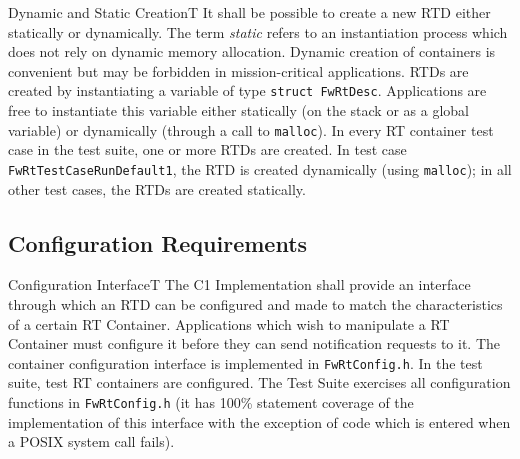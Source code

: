 \documentclass[a4paper,10pt]{article}
\newenvironment{fw_req}[6]
{\addtocounter{subsubsection}{1}
	\hspace{0.2cm}\textbf{FW-\arabic{section}.\arabic{subsection}.\arabic{subsubsection}/#2
	\hspace{0.8cm} #1}
	\vspace{-10pt}
\begin{longtable}{p{2.7cm}P{8.5cm}}
\hline
\textsc{Requirement} & #3 \\
\textsc{Justification} & #4 \\
\textsc{Implementation} & #5  \\ 
\textsc{Verification} & #6  \\
\hline
}
{\end{longtable}}
\newenvironment{fw_req_note}[7]
{\addtocounter{subsubsection}{1}
	\hspace{0.2cm}\textbf{FW-\arabic{section}.\arabic{subsection}.\arabic{subsubsection}/#2
	\hspace{0.8cm} #1}
	\vspace{-10pt}
\begin{longtable}{p{2.7cm}P{8.5cm}}
\hline
\textsc{Requirement} & #3 \\
\textsc{Note} & #4 \\
\textsc{Justification} & #5 \\
\textsc{Implementation} & #6  \\ 
\textsc{Verification} & #7  \\
\hline
}
{\end{longtable}}
\begin{document}
\begin{fw_req_note}{Dynamic and Static Creation}{T}
{ It shall be possible to create a new RTD either statically or dynamically.}
{The term \emph{static} refers to an instantiation process which does not rely on dynamic memory allocation.}
{Dynamic creation of containers is convenient but may be forbidden in mission-critical applications.}
{RTDs are created by instantiating a variable of type \texttt{struct FwRtDesc}. Applications are free to instantiate this variable either statically (on the stack or as a global variable) or dynamically (through a call to \texttt{malloc}). } 
{In every RT container test case in the test suite, one or more RTDs are created. In test case \texttt{FwRtTestCaseRunDefault1}, the RTD is created dynamically (using \texttt{malloc}); in all other test cases, the RTDs are created statically.}
\end{fw_req_note}


\subsection{Configuration Requirements}\label{req:configInterfaceRTD}

\begin{fw_req}{Configuration Interface}{T}
{The C1 Implementation shall provide an interface through which an RTD can be configured and made to match the characteristics of a certain RT Container.}
{Applications which wish to manipulate a RT Container must configure it before they can send notification requests to it.}
{The container configuration interface is implemented in \texttt{FwRtConfig.h}.} 
{In the test suite, test RT containers are configured. The Test Suite exercises all configuration functions in \texttt{FwRtConfig.h} (it has 100\% statement coverage of the implementation of this interface with the exception of code which is entered when a POSIX system call fails).}
\end{fw_req}
\end{document}
